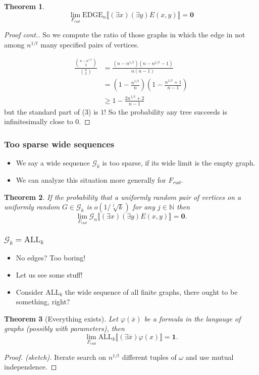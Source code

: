 \documentclass{beamer}
\newcommand{\N}{\mathbb{N}}
\newcommand{\bbl}{\llbracket}
\newcommand{\bbr}{\rrbracket}
\newcommand{\G}{\mathcal{G}}
\newcommand{\0}{\textbf{0}}
\newcommand{\1}{\textbf{1}}
\newcommand{\EDGE}{\text{EDGE}}
\newcommand{\ALL}{\text{ALL}}
\newtheorem{thrm}{Theorem}
\begin{document}
\begin{frame}
\begin{thrm}
\[\lim_{F_{rud}}\EDGE_n\bbl(\exists x)(\exists y)E(x,y)\bbr=\0\]
\end{thrm}
\begin{proof}[Proof cont.]
So we compute the ratio of those graphs in which the edge in not among $n^{1/t}$ many specified pairs of vertices.

\vspace{-1em}
\begin{align}
\frac{\binom{n-n^{1/t}}{2}}{\binom{n}{2}}&=\frac{(n-n^{1/t})(n-n^{1/t}-1)}{n(n-1)}\\
&=\left(1-\frac{n^{1/t}}{n}\right)\left(1-\frac{n^{1/t}+1}{n-1}\right)\\
&\geq 1-\frac{2n^{1/t}+2}{n-1}
\end{align}
but the standard part of (3) is $1$! So the probability any tree succeeds is infinitesimally close to $0$.
\end{proof}
\end{frame}

\begin{frame}
\frametitle{Too sparse wide sequences}
\begin{itemize}[<+->]
\item We say a wide sequence $\G_k$ is too sparse, if its wide limit is the empty graph.
\item We can analyze this situation more generally for $F_{rud}$.
\end{itemize}
\pause
\begin{thrm}
If the probability that a uniformly random pair of vertices on a uniformly random $G\in\G_k$ is $o(1/\sqrt[j]{k})$ for any $j\in \N$ then
\[\lim_{F_{rud}}\G_n\bbl(\exists x)(\exists y)E(x,y)\bbr=\0.\]
\end{thrm}
\end{frame}

\begin{frame}
\frametitle{$\G_k=\ALL_k$}
\begin{itemize}[<+->]
\item No edges? Too boring! \pause
\item Let us see some stuff! \pause
\item Consider $\ALL_k$ the wide sequence of all finite graphs, there ought to be something, right?
\end{itemize}
\pause
\begin{thrm}[Everything exists]
Let $\varphi(\overline x)$ be a formula in the langauge of graphs (possibly with parameters), then
\[\lim_{F_{rud}}\ALL_k\bbl(\exists \overline x)\varphi(x)\bbr=\1.\]
\end{thrm}
\begin{proof}[Proof. (sketch)]
Iterate search on $n^{1/t}$ different tuples of $\omega$ and use mutual independence.
\end{proof}
\end{frame}
\end{document}
